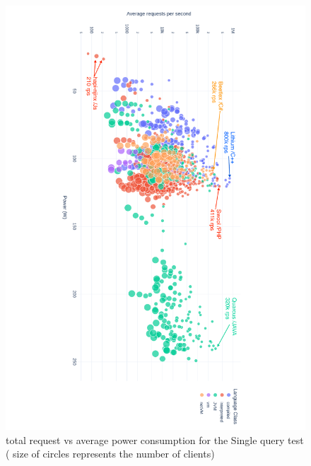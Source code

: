 \begin{figure}[hbt]
    \caption{total request vs average power consumption for the Single query test ( size of circles represents the number of clients) }
    \label{fig:power_requests_query}
    \includegraphics[width=
        \columnwidth,angle=9
        0]{imgs/power_requests_query_log}

\end{figure}

